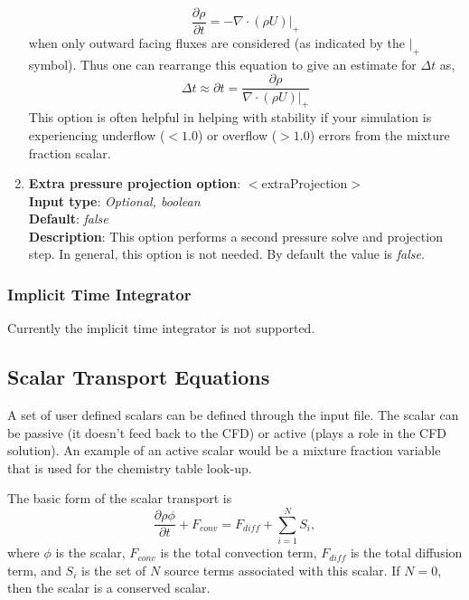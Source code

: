 \begin{enumerate}
\[
\frac{\partial \rho}{\partial t} = -\nabla \cdot (\rho U)|_{+}
\]
when only outward facing fluxes are considered (as indicated by the $|_+$ symbol).  Thus one can rearrange this equation to give an estimate for $\Delta t$ as, 
\[ 
\Delta t \approx \partial t =  \frac{\partial \rho}{  \nabla \cdot (\rho U)|_{+}}
\] 
This option is often helpful in helping with stability if your simulation is experiencing underflow ($<1.0$) or overflow ($>1.0$) errors from the mixture fraction scalar.  
%
\item {\bf Extra pressure projection option}: $<$extraProjection$>$ \\
{\bf Input type}: {\it Optional, boolean} \\
{\bf Default}: {\it false}   \\ 
{\bf Description}: This option performs a second pressure solve and projection step.  In general, this option is not needed. By default the value is {\it false}.   
 \end{enumerate}

\subsubsection{Implicit Time Integrator}
%
Currently the implicit time integrator is not supported. 

\subsection{Scalar Transport Equations}\label{Sec:Scalar_transport}
A set of user defined scalars can be defined through the input file.  The scalar can be passive (it doesn't feed back to the CFD) or active (plays a role in the CFD solution).  An example of an active scalar would be a mixture fraction variable that is used for the chemistry table look-up. 

The basic form of the scalar transport is
%
\begin{equation}
\frac{\partial \rho \phi}{\partial t} + F_{conv} = F_{diff} + \sum_{i=1}^{N} S_i, 
\end{equation}
% 
where $\phi$ is the scalar, $F_{conv}$ is the total convection term, $F_{diff}$ is the total diffusion term, and $S_i$ is the set of $N$ source terms associated with this scalar.  If $N=0$, then the scalar is a conserved scalar.

